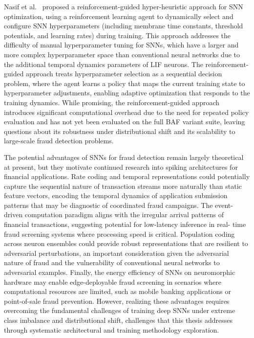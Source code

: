 Nasif et al.~\cite{nasif2026reinforcement} proposed a reinforcement-guided
hyper-heuristic approach for SNN optimization, using a reinforcement learning
agent to dynamically select and configure SNN hyperparameters (including
membrane time constants, threshold potentials, and learning rates) during
training. This approach addresses the difficulty of manual hyperparameter tuning
for SNNs, which have a larger and more complex hyperparameter space than
conventional neural networks due to the additional temporal dynamics parameters
of LIF neurons. The reinforcement-guided approach treats hyperparameter
selection as a sequential decision problem, where the agent learns a policy that
maps the current training state to hyperparameter adjustments, enabling adaptive
optimization that responds to the training dynamics. While promising, the
reinforcement-guided approach introduces significant computational overhead due
to the need for repeated policy evaluation and has not yet been evaluated on the
full BAF variant suite, leaving questions about its robustness under
distributional shift and its scalability to large-scale fraud detection
problems.

The potential advantages of SNNs for fraud detection remain largely theoretical
at present, but they motivate continued research into spiking architectures for
financial applications. Rate coding and temporal representations could
potentially capture the sequential nature of transaction streams more naturally
than static feature vectors, encoding the temporal dynamics of application
submission patterns that may be diagnostic of coordinated fraud campaigns. The
event-driven computation paradigm aligns with the irregular arrival patterns of
financial transactions, suggesting potential for low-latency inference in real-
time fraud screening systems where processing speed is critical. Population
coding across neuron ensembles could provide robust representations that are
resilient to adversarial perturbations, an important consideration given the
adversarial nature of fraud and the vulnerability of conventional neural
networks to adversarial examples. Finally, the energy efficiency of SNNs on
neuromorphic hardware may enable edge-deployable fraud screening in scenarios
where computational resources are limited, such as mobile banking applications
or point-of-sale fraud prevention. However, realizing these advantages requires
overcoming the fundamental challenges of training deep SNNs under extreme class
imbalance and distributional shift, challenges that this thesis addresses
through systematic architectural and training methodology exploration.

